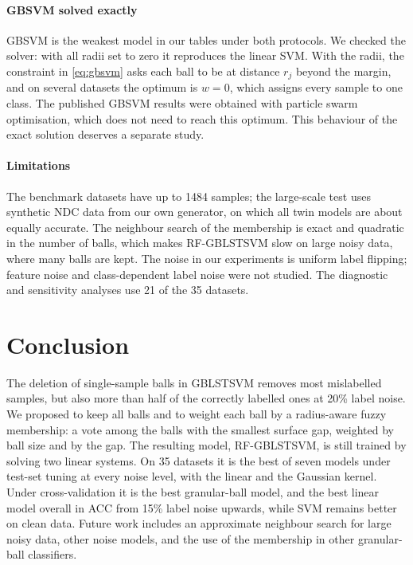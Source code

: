 \documentclass[preprint,12pt]{elsarticle}
\newcommand{\RF}{RF-GBLSTSVM}
\begin{document}
\paragraph{GBSVM solved exactly} GBSVM is the weakest model in our tables under both protocols. We checked the solver: with all radii set to zero it reproduces the linear SVM. With the radii, the constraint in \eqref{eq:gbsvm} asks each ball to be at distance $r_j$ beyond the margin, and on several datasets the optimum is $w=0$, which assigns every sample to one class. The published GBSVM results were obtained with particle swarm optimisation, which does not need to reach this optimum. This behaviour of the exact solution deserves a separate study.

\paragraph{Limitations} The benchmark datasets have up to 1484 samples; the large-scale test uses synthetic NDC data from our own generator, on which all twin models are about equally accurate. The neighbour search of the membership is exact and quadratic in the number of balls, which makes \RF{} slow on large noisy data, where many balls are kept. The noise in our experiments is uniform label flipping; feature noise and class-dependent label noise were not studied. The diagnostic and sensitivity analyses use 21 of the 35 datasets.

\section{Conclusion}
\label{sec:conclusion}

The deletion of single-sample balls in GBLSTSVM removes most mislabelled samples, but also more than half of the correctly labelled ones at 20\% label noise. We proposed to keep all balls and to weight each ball by a radius-aware fuzzy membership: a vote among the balls with the smallest surface gap, weighted by ball size and by the gap. The resulting model, \RF{}, is still trained by solving two linear systems. On 35 datasets it is the best of seven models under test-set tuning at every noise level, with the linear and the Gaussian kernel. Under cross-validation it is the best granular-ball model, and the best linear model overall in ACC from 15\% label noise upwards, while SVM remains better on clean data. Future work includes an approximate neighbour search for large noisy data, other noise models, and the use of the membership in other granular-ball classifiers.
\end{document}
